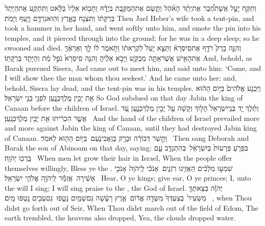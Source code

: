 {וַתִּקַּ֣ח יָעֵ֣ל אֵֽשֶׁת\maqqaf חֶ֠בֶר אֶת\maqqaf יְתַ֨ד הָאֹ֜הֶל וַתָּ֧שֶׂם אֶת\maqqaf הַמַּקֶּ֣בֶת בְּיָדָ֗הּ וַתָּב֤וֹא אֵלָיו֙ בַּלָּ֔אט וַתִּתְקַ֤ע אֶת\maqqaf הַיָּתֵד֙ בְּרַקָּת֔וֹ וַתִּצְנַ֖ח בָּאָ֑רֶץ וְהֽוּא\maqqaf נִרְדָּ֥ם וַיָּ֖עַף וַיָּמֹֽת׃}
{Then Jael Heber’s wife took a tent-pin, and took a hammer in her hand, and went softly unto him, and smote the pin into his temples, and it pierced through into the ground; for he was in a deep sleep; so he swooned and died.}
{וְהִנֵּ֣ה בָרָק֮ רֹדֵ֣ף אֶת\maqqaf סִֽיסְרָא֒ וַתֵּצֵ֤א יָעֵל֙ לִקְרָאת֔וֹ וַתֹּ֣אמֶר ל֔וֹ לֵ֣ךְ וְאַרְאֶ֔ךָּ אֶת\maqqaf הָאִ֖ישׁ אֲשֶׁר\maqqaf אַתָּ֣ה מְבַקֵּ֑שׁ וַיָּבֹ֣א אֵלֶ֔יהָ וְהִנֵּ֤ה סִֽיסְרָא֙ נֹפֵ֣ל מֵ֔ת וְהַיָּתֵ֖ד בְּרַקָּתֽוֹ׃}
{And, behold, as Barak pursued Sisera, Jael came out to meet him, and said unto him: ‘Come, and I will show thee the man whom thou seekest.’ And he came unto her; and, behold, Sisera lay dead, and the tent-pin was in his temples.}
{וַיַּכְנַ֤ע אֱלֹהִים֙ בַּיּ֣וֹם הַה֔וּא אֵ֖ת יָבִ֣ין מֶֽלֶךְ\maqqaf כְּנָ֑עַן לִפְנֵ֖י בְּנֵ֥י יִשְׂרָאֵֽל׃}
{So God subdued on that day Jabin the king of Canaan before the children of Israel.}
{וַתֵּ֜לֶךְ יַ֤ד בְּנֵֽי\maqqaf יִשְׂרָאֵל֙ הָל֣וֹךְ וְקָשָׁ֔ה עַ֖ל יָבִ֣ין מֶלֶךְ\maqqaf כְּנָ֑עַן עַ֚ד אֲשֶׁ֣ר הִכְרִ֔יתוּ אֵ֖ת יָבִ֥ין מֶלֶךְ\maqqaf כְּנָֽעַן׃ \petucha }
{And the hand of the children of Israel prevailed more and more against Jabin the king of Canaan, until they had destroyed Jabin king of Canaan.}
\newperek
{}
{וַתָּ֣שַׁר דְּבוֹרָ֔ה וּבָרָ֖ק בֶּן\maqqaf אֲבִינֹ֑עַם \setuma  בַּיּ֥וֹם הַה֖וּא לֵאמֹֽר׃ \setuma }
{Then sang Deborah and Barak the son of Abinoam on that day, saying:}
{בִּפְרֹ֤עַ פְּרָעוֹת֙ בְּיִשְׂרָאֵ֔ל \setuma  בְּהִתְנַדֵּ֖ב עָ֑ם בָּֽרְכ֖וּ יְהֹוָֽה׃ \setuma }
{When men let grow their hair in Israel, When the people offer themselves willingly, Bless ye the \lord.}
{שִׁמְע֣וּ מְלָכִ֔ים הַאֲזִ֖ינוּ רֹֽזְנִ֑ים \setuma  אָנֹכִ֗י לַֽיהֹוָה֙ אָנֹכִ֣י אָשִׁ֔ירָה \setuma  אֲזַמֵּ֕ר לַֽיהֹוָ֖ה אֱלֹהֵ֥י יִשְׂרָאֵֽל׃ \setuma }
{Hear, O ye kings; give ear, O ye princes; I, unto the \lord\space will I sing; I will sing praise to the \lord, the God of Israel.}
{יְהֹוָ֗ה בְּצֵאתְךָ֤ מִשֵּׂעִיר֙ \setuma  בְּצַעְדְּךָ֙ מִשְּׂדֵ֣ה אֱד֔וֹם \setuma  אֶ֣רֶץ רָעָ֔שָׁה גַּם\maqqaf שָׁמַ֖יִם נָטָ֑פוּ \setuma  גַּם\maqqaf עָבִ֖ים נָ֥טְפוּ מָֽיִם׃ \setuma }
{\lord, when Thou didst go forth out of Seir, When Thou didst march out of the field of Edom, The earth trembled, the heavens also dropped, Yea, the clouds dropped water.}
